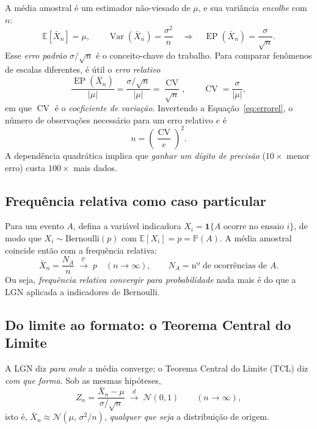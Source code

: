 \documentclass[12pt,a4paper]{article}
\newcommand{\E}{\mathbb{E}}
\newcommand{\Prob}{\mathbb{P}}
\newcommand{\Var}{\operatorname{Var}}
\newcommand{\EP}{\operatorname{EP}}
\newcommand{\CV}{\operatorname{CV}}
\begin{document}
A média amostral é um estimador não-viesado de $\mu$, e sua variância \emph{encolhe}
com $n$:
\begin{equation}
  \E[\bar{X}_n] = \mu, \qquad
  \Var(\bar{X}_n) = \frac{\sigma^2}{n}
  \quad\Longrightarrow\quad
  \EP(\bar{X}_n) = \frac{\sigma}{\sqrt{n}} .
\end{equation}
Esse \emph{erro padrão} $\sigma/\sqrt{n}$ é o conceito-chave do trabalho. Para comparar
fenômenos de escalas diferentes, é útil o \emph{erro relativo}
\begin{equation}\label{eq:errorel}
  \frac{\EP(\bar{X}_n)}{|\mu|} = \frac{\sigma/\sqrt{n}}{|\mu|} = \frac{\CV}{\sqrt{n}},
  \qquad \CV = \frac{\sigma}{|\mu|},
\end{equation}
em que $\CV$ é o \emph{coeficiente de variação}. Invertendo a
Equação~\eqref{eq:errorel}, o número de observações necessário para um erro relativo
$e$ é
\begin{equation}\label{eq:custon}
  n = \left(\frac{\CV}{e}\right)^2 .
\end{equation}
A dependência quadrática implica que \emph{ganhar um dígito de precisão} ($10\times$
menor erro) custa $100\times$ mais dados.

\subsection{Frequência relativa como caso particular}

Para um evento $A$, defina a variável indicadora $X_i = \mathbf{1}\{A\text{ ocorre no
ensaio }i\}$, de modo que $X_i \sim \text{Bernoulli}(p)$ com $\E[X_i] = p = \Prob(A)$.
A média amostral coincide então com a frequência relativa:
\begin{equation}
  \bar{X}_n = \frac{N_A}{n} \;\xrightarrow{\;\Prob\;}\; p \quad (n\to\infty),
  \qquad N_A = \text{nº de ocorrências de } A .
\end{equation}
Ou seja, \emph{frequência relativa convergir para probabilidade} nada mais é do que a
LGN aplicada a indicadores de Bernoulli.

\subsection{Do limite ao formato: o Teorema Central do Limite}

A LGN diz \emph{para onde} a média converge; o Teorema Central do Limite (TCL) diz
\emph{com que forma}. Sob as mesmas hipóteses,
\begin{equation}\label{eq:tcl}
  Z_n = \frac{\bar{X}_n - \mu}{\sigma/\sqrt{n}}
  \;\xrightarrow{\;d\;}\; \mathcal{N}(0,1) \qquad (n\to\infty),
\end{equation}
isto é, $\bar{X}_n \approx \mathcal{N}(\mu,\,\sigma^2/n)$, \emph{qualquer que seja} a
distribuição de origem.
\end{document}
